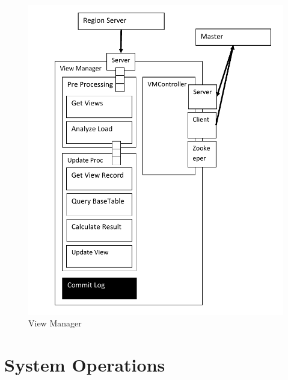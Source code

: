 \begin{figure}[h!]
  
  \centering
    \includegraphics[width=\linewidth]{figures/ViewManager}
    \caption{View Manager}
    \label{fig:viewmanager}
\end{figure}
\newpage



\chapter{System Operations}
\label{chapter:Sytem Operations}


